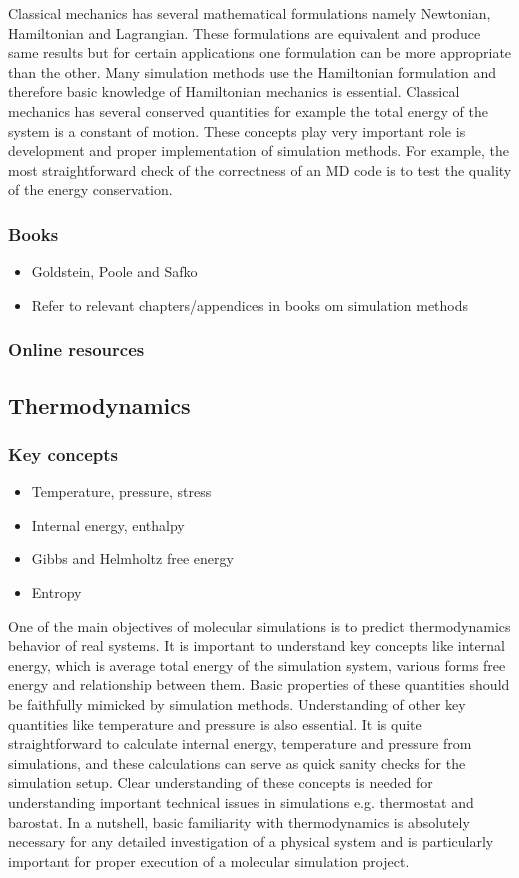 \documentclass[9pt,bestpractices]{livecoms}
\begin{document}
Classical mechanics has several mathematical formulations namely Newtonian, Hamiltonian and Lagrangian. These formulations are equivalent and produce same results but for certain applications one formulation can be more appropriate than the other. Many simulation methods use the Hamiltonian formulation and therefore basic knowledge of Hamiltonian mechanics is essential. Classical mechanics has several conserved quantities for example the total energy of the system is a constant of motion. These concepts play very important role is development and proper implementation of simulation methods. For example, the most straightforward check of the correctness of an MD code is to test the quality of the energy conservation.

\subsubsection{Books}
\begin{itemize}
\item Goldstein, Poole and Safko
\item Refer to relevant chapters/appendices in books om simulation methods
\end{itemize}

\subsubsection{Online resources}


\subsection{Thermodynamics}
\subsubsection{Key concepts}
\begin{itemize}
\item Temperature, pressure, stress
\item Internal energy, enthalpy
\item Gibbs and Helmholtz free energy
\item Entropy
\end{itemize}

One of the main objectives of molecular simulations is to predict thermodynamics behavior of real systems. It is important to understand key concepts like internal energy, which is average total energy of the simulation system, various forms free energy and relationship between them. Basic properties of these quantities should be faithfully mimicked by simulation methods. Understanding of other key quantities like temperature and pressure is also essential. It is quite straightforward to calculate internal energy, temperature and pressure from simulations, and these calculations can serve as quick sanity checks for the simulation setup. Clear understanding of these concepts is needed for understanding important technical issues in simulations e.g. thermostat and barostat.
In a nutshell, basic familiarity with thermodynamics is absolutely necessary for any detailed investigation of a physical system and is particularly important for proper execution of a molecular simulation project.
\end{document}
